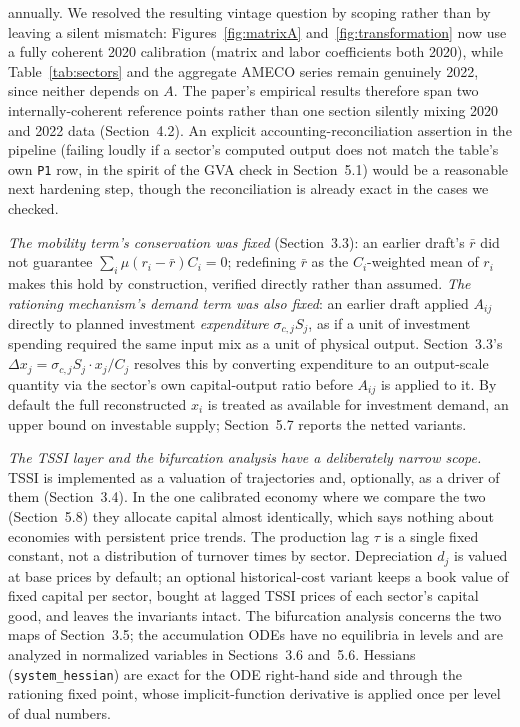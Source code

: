 \documentclass[11pt]{article}
\begin{document}
annually. We resolved the resulting vintage question by scoping rather
than by leaving a silent mismatch: Figures~\ref{fig:matrixA}
and~\ref{fig:transformation} now use a fully coherent 2020 calibration
(matrix and labor coefficients both 2020), while Table~\ref{tab:sectors}
and the aggregate AMECO series remain genuinely 2022, since neither
depends on $A$. The paper's empirical results therefore span two
internally-coherent reference points rather than one section silently
mixing 2020 and 2022 data (Section~4.2). An
explicit accounting-reconciliation assertion in the pipeline (failing
loudly if a sector's computed output does not match the table's own
\texttt{P1} row, in the spirit of the GVA check in Section~5.1) would be
a reasonable next hardening step, though the reconciliation is already
exact in the cases we checked.

\emph{The mobility term's conservation was fixed} (Section~3.3): an
earlier draft's $\bar r$ did not guarantee $\sum_i\mu(r_i-\bar r)C_i=0$;
redefining $\bar r$ as the $C_i$-weighted mean of $r_i$ makes this hold
by construction, verified directly rather than assumed. \emph{The
rationing mechanism's demand term was also fixed}: an earlier draft
applied $A_{ij}$ directly to planned investment \emph{expenditure}
$\sigma_{c,j}S_j$, as if a unit of investment spending required the same
input mix as a unit of physical output. Section~3.3's
$\Delta x_j=\sigma_{c,j}S_j\cdot x_j/C_j$ resolves this by converting
expenditure to an output-scale quantity via the sector's own
capital-output ratio before $A_{ij}$ is applied to it. By default the
full reconstructed $x_i$ is treated as available for investment demand,
an upper bound on investable supply; Section~5.7 reports the netted
variants.

\emph{The TSSI layer and the bifurcation analysis have a deliberately
narrow scope.} TSSI is implemented as a valuation of trajectories and,
optionally, as a driver of them (Section~3.4). In the one calibrated
economy where we compare the two (Section~5.8) they allocate capital
almost identically, which says nothing about economies with persistent
price trends. The production lag $\tau$ is a single
fixed constant, not a distribution of turnover times by sector.
Depreciation $d_j$ is valued at base prices by default; an optional
historical-cost variant keeps a book value of fixed capital per sector,
bought at lagged TSSI prices of each sector's capital good, and leaves
the invariants intact. The bifurcation analysis concerns the two maps of
Section~3.5; the accumulation ODEs have no equilibria in levels and are
analyzed in normalized variables in Sections~3.6 and~5.6. Hessians
(\texttt{system\_hessian}) are exact for the ODE right-hand side and
through the rationing fixed point, whose implicit-function derivative is
applied once per level of dual numbers.
\end{document}
